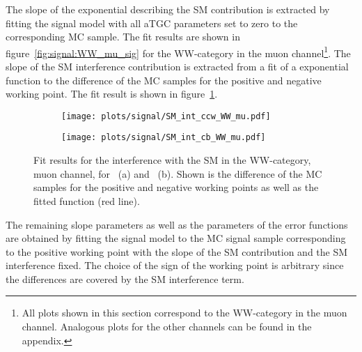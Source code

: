 \noindent The slope of the exponential describing the SM contribution is extracted by fitting the signal model with all aTGC parameters set to zero to the corresponding MC sample. The fit results are shown in figure~\ref{fig:signal:WW_mu_sig} for the WW-category in the muon channel\footnote{All plots shown in this section correspond to the WW-category in the muon channel. Analogous plots for the other channels can be found in the appendix.}. The slope of the SM interference contribution is extracted from a fit of a exponential function to the difference of the MC samples for the positive and negative working point. The fit result is shown in figure~\ref{fig:signal:sm_int_WW_mu}.\\
\begin{figure}
	\centering
	\begin{subfigure}{0.49\textwidth}
		\texttt{[image: plots/signal/SM\_int\_ccw\_WW\_mu.pdf]}
		\caption{}
	\end{subfigure}
	\begin{subfigure}{0.49\textwidth}
		\texttt{[image: plots/signal/SM\_int\_cb\_WW\_mu.pdf]}
		\caption{}
	\end{subfigure}
	\caption[Fit results for the interference with the SM in the WW-category, muon channel]{Fit results for the interference with the SM in the WW-category, muon channel, for \Tccw \ (a) and \Tcb \ (b). Shown is the difference of the MC samples for the positive and negative working points as well as the fitted function (red line).}
	\label{fig:signal:sm_int_WW_mu}
\end{figure}

\noindent The remaining slope parameters as well as the parameters of the error functions are obtained by fitting the signal model to the MC signal sample corresponding to the positive working point with the slope of the SM contribution and the SM interference fixed. The choice of the sign of the working point is arbitrary since the differences are covered by the SM interference term.

